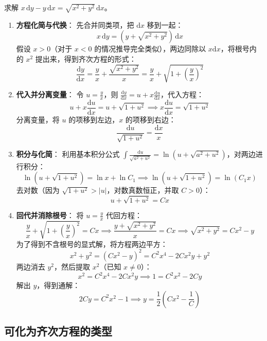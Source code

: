\documentclass[lang=cn,11pt]{elegantbook}
\begin{document}
\begin{exercise}
求解 $x\,\mathrm{d}y-y\,\mathrm{d}x=\sqrt{x^{2}+y^{2}}\,\mathrm{d}x$。
\end{exercise}
\begin{solution}
\begin{enumerate}
    \item \textbf{方程化简与代换}：
    先合并同类项，把 $\mathrm{d}x$ 移到一起：
    \[
    x\,\mathrm{d}y = \left( y + \sqrt{x^2+y^2} \right)\,\mathrm{d}x
    \]
    假设 $x>0$（对于 $x<0$ 的情况推导完全类似），两边同除以 $x\mathrm{d}x$，将根号内的 $x^2$ 提出来，得到齐次方程的形式：
    \[
    \frac{\mathrm{d}y}{\mathrm{d}x} = \frac{y}{x} + \frac{\sqrt{x^2+y^2}}{x} = \frac{y}{x} + \sqrt{1+\left(\frac{y}{x}\right)^2}
    \]
    \item \textbf{代入并分离变量}：
    令 $u=\frac{y}{x}$，则 $\frac{\mathrm{d}y}{\mathrm{d}x} = u + x\frac{\mathrm{d}u}{\mathrm{d}x}$，代入方程：
    \[
    u + x\frac{\mathrm{d}u}{\mathrm{d}x} = u + \sqrt{1+u^2} \implies x\frac{\mathrm{d}u}{\mathrm{d}x} = \sqrt{1+u^2}
    \]
    分离变量，将 $u$ 的项移到左边，$x$ 的项移到右边：
    \[
    \frac{\mathrm{d}u}{\sqrt{1+u^2}} = \frac{\mathrm{d}x}{x}
    \]
    \item \textbf{积分与化简}：
    利用基本积分公式 $\int \frac{\mathrm{d}u}{\sqrt{a^2+u^2}} = \ln(u+\sqrt{a^2+u^2})$，对两边进行积分：
    \[
    \ln\left(u+\sqrt{1+u^2}\right) = \ln x + \ln C_1 \implies \ln\left(u+\sqrt{1+u^2}\right) = \ln(C_1 x)
    \]
    去对数（因为 $\sqrt{1+u^2}>|u|$，对数真数恒正，并取 $C>0$）：
    \[
    u + \sqrt{1+u^2} = Cx
    \]
    \item \textbf{回代并消除根号}：
    将 $u=\frac{y}{x}$ 代回方程：
    \[
    \frac{y}{x} + \sqrt{1+\left(\frac{y}{x}\right)^2} = Cx \implies \frac{y + \sqrt{x^2+y^2}}{x} = Cx \implies \sqrt{x^2+y^2} = Cx^2 - y
    \]
    为了得到不含根号的显式解，将方程两边平方：
    \[
    x^2 + y^2 = (Cx^2 - y)^2 = C^2x^4 - 2Cx^2y + y^2
    \]
    两边消去 $y^2$，然后提取 $x^2$（已知 $x \neq 0$）：
    \[
    x^2 = C^2x^4 - 2Cx^2y \implies 1 = C^2x^2 - 2Cy
    \]
    解出 $y$，得到通解：
    \[
    2Cy = C^2x^2 - 1 \implies \boxed{y = \frac{1}{2}\left(Cx^2 - \frac{1}{C}\right)}
    \]
\end{enumerate}
\end{solution}

\subsection{可化为齐次方程的类型}
\end{document}
